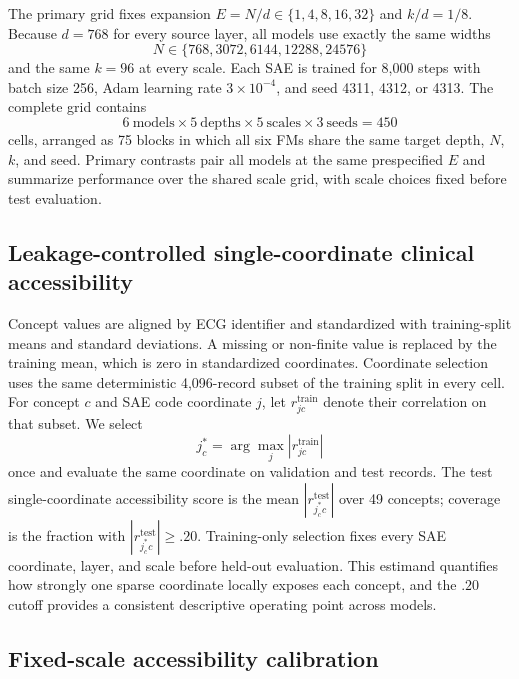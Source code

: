 The primary grid fixes expansion $E=N/d\in\{1,4,8,16,32\}$ and $k/d=1/8$. Because $d=768$ for every source layer, all models use exactly the same widths
\begin{equation}
  N\in\{768,3072,6144,12288,24576\}
\end{equation}
and the same $k=96$ at every scale. Each SAE is trained for 8,000 steps with batch size 256, Adam learning rate $3\times10^{-4}$, and seed 4311, 4312, or 4313. The complete grid contains
\begin{equation}
  6\ \text{models}\times5\ \text{depths}\times5\ \text{scales}\times3\ \text{seeds}=450
\end{equation}
cells, arranged as 75 blocks in which all six FMs share the same target depth, $N$, $k$, and seed. Primary contrasts pair all models at the same prespecified $E$ and summarize performance over the shared scale grid, with scale choices fixed before test evaluation.

\subsection{Leakage-controlled single-coordinate clinical accessibility}

Concept values are aligned by ECG identifier and standardized with training-split means and standard deviations. A missing or non-finite value is replaced by the training mean, which is zero in standardized coordinates. Coordinate selection uses the same deterministic 4,096-record subset of the training split in every cell. For concept $c$ and SAE code coordinate $j$, let $r^{\mathrm{train}}_{jc}$ denote their correlation on that subset. We select
\begin{equation}
  j_c^*=\arg\max_j |r^{\mathrm{train}}_{jc}|
\end{equation}
once and evaluate the same coordinate on validation and test records. The test single-coordinate accessibility score is the mean $|r^{\mathrm{test}}_{j_c^*c}|$ over 49 concepts; coverage is the fraction with $|r^{\mathrm{test}}_{j_c^*c}|\geq .20$. Training-only selection fixes every SAE coordinate, layer, and scale before held-out evaluation. This estimand quantifies how strongly one sparse coordinate locally exposes each concept, and the $.20$ cutoff provides a consistent descriptive operating point across models.

\subsection{Fixed-scale accessibility calibration}

